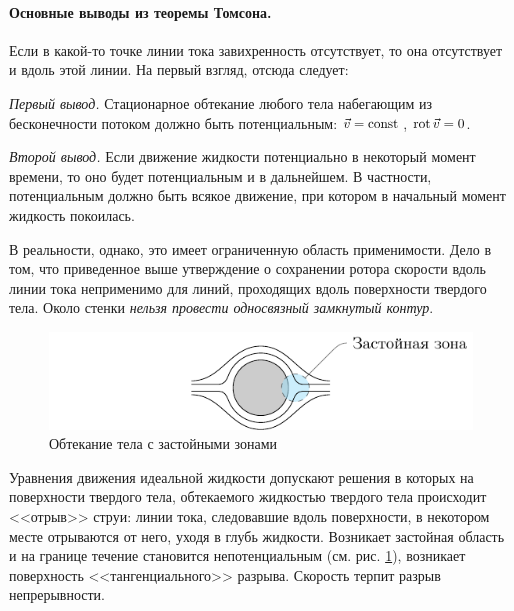 \paragraph{Основные выводы из теоремы Томсона.} Если в какой-то точке линии тока завихренность отсутствует, то она отсутствует и вдоль этой линии. На первый взгляд, отсюда следует:

\vspace{0.5em}
\textit{Первый вывод.} Стационарное обтекание любого тела набегающим из бесконечности потоком должно быть потенциальным: $\vec{v} = \mathrm{const}\,$, $\operatorname{rot}\vec{v} = 0$.
\vspace{0.5em}

\textit{Второй вывод.} Если движение жидкости потенциально в некоторый момент времени, то оно будет потенциальным и в дальнейшем. В частности, потенциальным должно быть всякое движение, при котором в начальный момент жидкость покоилась. 
\vspace{0.5em}

В реальности, однако, это имеет ограниченную область применимости. Дело в том, что приведенное выше утверждение о сохранении ротора скорости вдоль линии тока неприменимо для линий, проходящих вдоль поверхности твердого тела. Около стенки \textit{нельзя провести односвязный замкнутый контур}. 
\begin{figure}[H]
	\centering
	\includegraphics[scale=1.2]{img/tang}
	\caption{Обтекание тела с застойными зонами}
	\label{fig:figure14}
\end{figure}
Уравнения движения идеальной жидкости допускают решения в которых на поверхности твердого тела, обтекаемого жидкостью твердого тела происходит <<отрыв>> струи: линии тока, следовавшие вдоль поверхности, в некотором месте отрываются от него, уходя в глубь жидкости. Возникает застойная область и на границе течение становится непотенциальным (см. рис. \ref{fig:figure14}), возникает поверхность <<тангенциального>> разрыва. Скорость терпит разрыв непрерывности.


